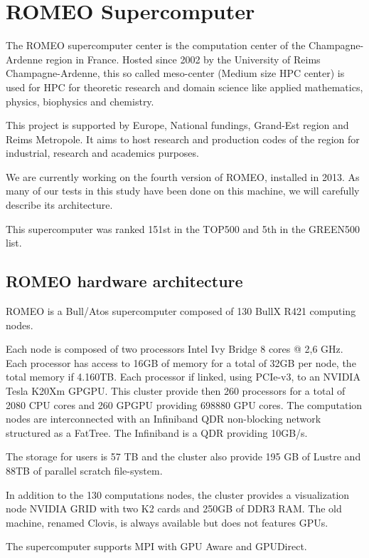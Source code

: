 \section{ROMEO Supercomputer}
The ROMEO supercomputer center is the computation center of the Champagne-Ardenne region in France. 
Hosted since 2002 by the University of Reims Champagne-Ardenne, this so called meso-center (Medium size HPC center) is used for HPC for theoretic research and domain science like applied mathematics, physics, biophysics and chemistry. 

This project is supported by Europe, National fundings, Grand-Est region and Reims Metropole. 
It aims to host research and production codes of the region for industrial, research and academics purposes. 

We are currently working on the fourth version of ROMEO, installed in 2013. 
As many of our tests in this study have been done on this machine, we will carefully describe its architecture. 

This supercomputer was ranked 151st in the TOP500 and 5th in the GREEN500 list. 

\subsection{ROMEO hardware architecture}
\label{sec:part1_ROMEO}
ROMEO is a Bull/Atos supercomputer composed of 130 BullX R421 computing nodes. 

Each node is composed of two processors Intel Ivy Bridge 8 cores @ 2,6 GHz. 
Each processor has access to 16GB of memory for a total of 32GB per node, the total memory if 4.160TB. 
Each processor if linked, using PCIe-v3, to an NVIDIA Tesla K20Xm GPGPU. 
This cluster provide then 260 processors for a total of 2080 CPU cores and 260 GPGPU providing 698880 GPU cores. 
The computation nodes are interconnected with an Infiniband QDR non-blocking network structured as a FatTree. 
The Infiniband is a QDR providing 10GB/s. 

The storage for users is 57 TB and the cluster also provide 195 GB of Lustre and 88TB of parallel scratch file-system. 

In addition to the 130 computations nodes, the cluster provides a visualization node NVIDIA GRID with two K2 cards and 250GB of DDR3 RAM. 
The old machine, renamed Clovis, is always available but does not features GPUs. 

The supercomputer supports MPI with GPU Aware and GPUDirect. 

